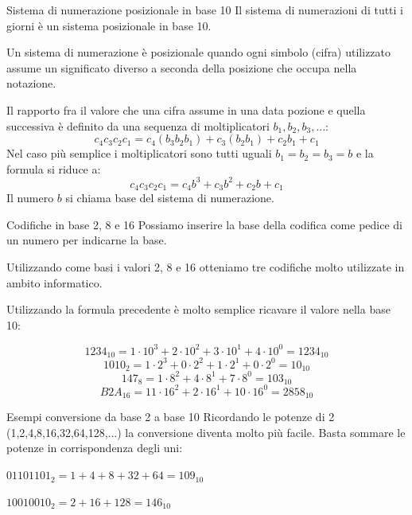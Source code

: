 \documentclass[9pt, handout]{beamer}
\begin{document}
\begin{frame}{Sistema di numerazione posizionale in base 10}
Il sistema di numerazioni di tutti i giorni è un sistema \alert{posizionale} in \alert{base 10}.

Un sistema di numerazione è \alert{posizionale} quando ogni simbolo (cifra) utilizzato assume un significato diverso a seconda della posizione che occupa nella notazione.

Il rapporto fra il valore che una cifra assume in una data pozione e quella successiva è definito da una sequenza di moltiplicatori $b_1, b_2, b_3, \dots$:
\[c_4c_3c_2c_1 = c_4(b_3b_2b_1) + c_3(b_2b_1) + c_2b_1 + c_1\]
\pause
Nel caso più semplice i moltiplicatori sono tutti uguali $b_1 = b_2 = b_3 = b$ e la formula si riduce a:
\[c_4c_3c_2c_1 = c_4b^3 + c_3b^2 + c_2b + c_1\]
Il numero $b$ si chiama \alert{base} del sistema di numerazione.
\end{frame}

\begin{frame}{Codifiche in base 2, 8 e 16}
Possiamo inserire la base della codifica come pedice di un numero per indicarne la base.

Utilizzando come basi i valori 2, 8 e 16 otteniamo tre codifiche molto utilizzate in ambito informatico.

Utilizzando la formula precedente è molto semplice ricavare il valore nella base 10:

\[1234_{10} = 1\cdot10^3 + 2\cdot10^2 + 3\cdot10^1 + 4\cdot10^0 = 1234_{10}\]
\pause
\[1010_{2}  = 1\cdot2^3  + 0\cdot2^2  + 1\cdot2^1  + 0\cdot2^0 = 10_{10}\]
\pause
\[147_8 = 1\cdot8^2 + 4\cdot8^1 + 7\cdot8^0 = 103_{10}\]
\pause
\[B2A_{16} = 11\cdot16^2 + 2\cdot16^1 + 10\cdot16^0 = 2858_{10}\]
\end{frame}

\begin{frame}{Esempi conversione da base 2 a base 10}
Ricordando le potenze di 2 (1,2,4,8,16,32,64,128,...) la conversione diventa molto più facile. Basta sommare le potenze in corrispondenza degli uni:

$01101101_2 = 1+4+8+32+64 = 109_{10}$

$10010010_2 = 2+16+128 = 146_{10}$
\end{frame}
\end{document}
